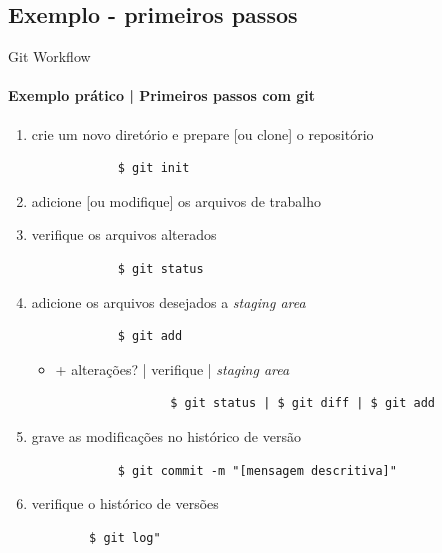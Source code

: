 \documentclass[xcolor=dvipsnames,t]{beamer}
\begin{document}
\subsection{Exemplo - primeiros passos}
\begin{frame}[fragile]{Git Workflow}
\framesubtitle{Exemplo prático | Primeiros passos com git}

	\begin{enumerate}
		\item crie um novo diretório e prepare [ou clone] o repositório
		\begin{verbatim}
			$ git init
		\end{verbatim}
		
		\item adicione [ou modifique] os arquivos de trabalho		
		
		\item verifique os arquivos alterados		
		\begin{verbatim}
			$ git status 
		\end{verbatim}
		
		\item adicione os arquivos desejados a \textit{staging area} 
		\begin{verbatim}
			$ git add
		\end{verbatim}
		
		\begin{itemize}
			\item + alterações? | verifique  |  \textit{staging area}
			\begin{verbatim}
				$ git status | $ git diff | $ git add
			\end{verbatim}
		\end{itemize}
	
		\item grave as modificações no histórico de versão
		\begin{verbatim}
			$ git commit -m "[mensagem descritiva]"
		\end{verbatim}
		
		\item verifique o histórico de versões
		\begin{verbatim}
		$ git log"
		\end{verbatim}
	\end{enumerate}

\end{frame}
\end{document}
